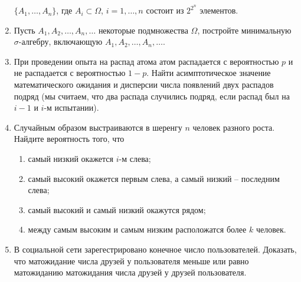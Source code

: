 \documentclass[a4paper, 14pt]{extarticle}
\begin{document}
\begin{enumerate}
	$\{A_1,\ldots, A_n\}$, где $A_i\subset\Omega$, $i = 1,\ldots, n$ состоит из $2^{2^n}$ элементов.
	\item Пусть $A_1,A_2,\ldots, A_n,\ldots$ некоторые подмножества $\Omega$, постройте минимальную $\sigma$-алгебру, включающую $A_1,A_2,\ldots, A_n,\ldots$.
	\item При проведении опыта на распад атома атом распадается с вероятностью $p$ и не распадается с вероятностью $1-p$. Найти асимптотическое значение математического ожидания и дисперсии числа появлений двух распадов подряд (мы считаем, что два распада случились подряд, если распад был на $i-1$ и $i$-м испытании).
	
\item Случайным образом выстраиваются в шеренгу $n$ человек разного
роста. Найдите вероятность того, что
\begin{enumerate}
	\item самый низкий окажется $i$-м слева;
	\item самый высокий окажется первым слева, а самый низкий -- последним слева;
	\item самый высокий и самый низкий окажутся рядом;
	\item между самым высоким и самым низким расположатся более $k$
человек.
\end{enumerate}

\item В социальной сети зарегестрировано конечное число пользователей. 
Доказать, что матожидание числа друзей у пользователя меньше или равно матожиданию матожидания числа друзей у друзей пользователя. 


\end{enumerate}
\end{document}
